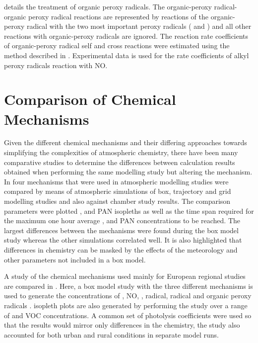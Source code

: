 \citep{Kirchner:1996} details the treatment of organic peroxy radicals. 
The organic-peroxy radical-organic peroxy radical reactions are represented by reactions of the organic-peroxy radical with the two most important peroxy radicals ( and ) and all other reactions with organic-peroxy radicals are ignored. 
The reaction rate coefficients of organic-peroxy radical self and cross reactions were estimated using the method described in \citep{Kirchner:1996}. 
Experimental data is used for the rate coefficients of alkyl peroxy radicals reaction with NO. 

\section{Comparison of Chemical Mechanisms}
Given the different chemical mechanisms and their differing approaches towards simplifying the complexities of atmospheric chemistry, there have been many comparative studies to determine the differences between calculation results obtained when performing the same modelling study but altering the mechanism. 
In \citep{Dunker:1984} four mechanisms that were used in atmospheric modelling studies were compared by means of atmospheric simulations of box, trajectory and grid modelling studies and also against chamber study results. 
The comparison parameters were plotted ,  and PAN isopleths as well as the time span required for the maximum one hour average ,  and PAN concentrations to be reached. 
The largest differences between the mechanisms were found during the box model study whereas the other simulations correlated well. 
It is also highlighted that differences in chemistry can be masked by the effects of the meteorology and other parameters not included in a box model.

A study of the chemical mechanisms used mainly for European regional studies are compared in \citep{Gross:2003}. 
Here, a box model study with the three different mechanisms is used to generate the concentrations of , NO, ,  radical,  radical and organic peroxy radicals . 
 isopleth plots are also generated by performing the study over a range of  and VOC concentrations. 
A common set of photolysis coefficients were used so that the results would mirror only differences in the chemistry, the study also accounted for both urban and rural conditions in separate model runs.

